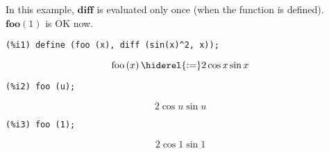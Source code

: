 \documentclass[12pt,leqno]{article}
\begin{document}
\begin{enumerate}
In this example, $\mathbf{diff}$ is evaluated only once (when the function is defined).
$\mathbf{foo} (1)$ is OK now.
\begin{verbatim}
(%i1) define (foo (x), diff (sin(x)^2, x));
\end{verbatim}
\begin{dmath}[number={\(\mathop{\mathrm{\%o}_{1}}\)}]
\mathop{\mathrm{foo}}\left(x\right) \hiderel{:=} 2 \cos x \sin x
\end{dmath}
\begin{verbatim}
(%i2) foo (u);
\end{verbatim}
\begin{dmath}[number={\(\mathop{\mathrm{\%o}_{2}}\)}]
2 \cos u \sin u
\end{dmath}
\begin{verbatim}
(%i3) foo (1);
\end{verbatim}
\begin{dmath}[number={\(\mathop{\mathrm{\%o}_{3}}\)}]
2 \cos 1 \sin 1
\end{dmath}


\end{enumerate}
\end{document}
